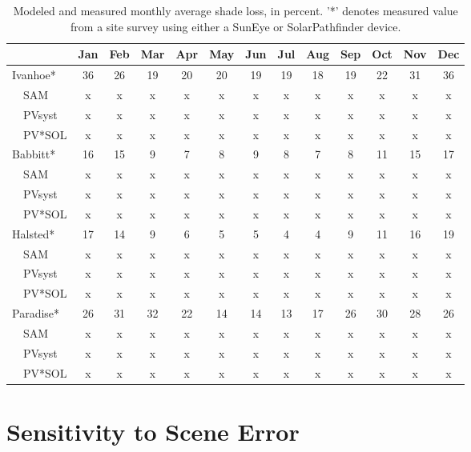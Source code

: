 \documentclass[twocolumn,10pt]{asme2ej}
\begin{document}
\begin{table}[h!]
\begin{center}
\begin{tabular}{lcccccccccccc}
 & Jan & Feb & Mar & Apr & May & Jun & Jul & Aug & Sep & Oct & Nov & Dec \\
\hline
Ivanhoe*  & 36 & 26 & 19 & 20 & 20 & 19 & 19 & 18 & 19 & 22 & 31 & 36 \\
~~SAM     & x & x & x & x & x & x & x & x & x & x & x & x \\
~~PVsyst  & x & x & x & x & x & x & x & x & x & x & x & x \\
~~PV*SOL  & x & x & x & x & x & x & x & x & x & x & x & x \\
\hline
Babbitt* & 16 & 15 & 9 & 7 & 8 & 9 & 8 & 7 & 8 & 11 & 15 & 17 \\
~~SAM     & x & x & x & x & x & x & x & x & x & x & x & x \\
~~PVsyst  & x & x & x & x & x & x & x & x & x & x & x & x \\
~~PV*SOL  & x & x & x & x & x & x & x & x & x & x & x & x \\
\hline
Halsted* & 17 & 14 & 9 & 6 & 5 & 5 & 4 & 4 & 9 & 11 & 16 & 19 \\
~~SAM     & x & x & x & x & x & x & x & x & x & x & x & x \\
~~PVsyst  & x & x & x & x & x & x & x & x & x & x & x & x \\
~~PV*SOL  & x & x & x & x & x & x & x & x & x & x & x & x \\
\hline
Paradise* & 26 & 31 & 32 & 22 & 14 & 14 & 13 & 17 & 26 & 30 & 28 & 26 \\
~~SAM     & x & x & x & x & x & x & x & x & x & x & x & x \\
~~PVsyst  & x & x & x & x & x & x & x & x & x & x & x & x \\
~~PV*SOL  & x & x & x & x & x & x & x & x & x & x & x & x \\
\end{tabular}
\caption{Modeled and measured monthly average shade loss, in percent. '*' denotes measured value from a site survey using either a SunEye or SolarPathfinder device.}
\label{Label}
\end{center}
\end{table}




\section{Sensitivity to Scene Error}
\end{document}
